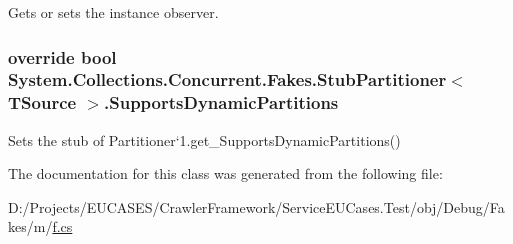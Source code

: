 Gets or sets the instance observer.

\hypertarget{class_system_1_1_collections_1_1_concurrent_1_1_fakes_1_1_stub_partitioner_3_01_t_source_01_4_ac2c253c6e3817c072674cf261eaffe99}{
\subsubsection[{Supports\-Dynamic\-Partitions}]{\setlength{\rightskip}{0pt plus 5cm}override bool System.\-Collections.\-Concurrent.\-Fakes.\-Stub\-Partitioner$<$ T\-Source $>$.Supports\-Dynamic\-Partitions\hspace{0.3cm}{\ttfamily [get]}}}\label{class_system_1_1_collections_1_1_concurrent_1_1_fakes_1_1_stub_partitioner_3_01_t_source_01_4_ac2c253c6e3817c072674cf261eaffe99}


Sets the stub of Partitioner`1.get\-\_\-\-Supports\-Dynamic\-Partitions()



The documentation for this class was generated from the following file\-:\begin{DoxyCompactItemize}
\item 
D\-:/\-Projects/\-E\-U\-C\-A\-S\-E\-S/\-Crawler\-Framework/\-Service\-E\-U\-Cases.\-Test/obj/\-Debug/\-Fakes/m/\hyperlink{m_2f_8cs}{f.\-cs}\end{DoxyCompactItemize}
